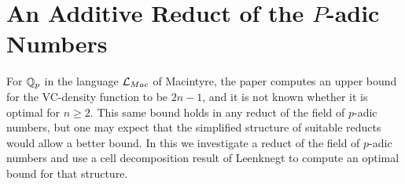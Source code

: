 



\chapter{An Additive Reduct of the $P$-adic Numbers}
For $\mathbb{Q}_p$ in the language $\mathcal L_{Mac}$ of Macintyre, the paper \cite{density} computes an upper bound for the VC-density function to be $2n-1$, and it is not known whether it is optimal for $n \geq 2$.
This same bound holds in any reduct of the field of $p$-adic numbers, but one may expect that the simplified structure of suitable reducts would allow a better bound.
In this \chapa we investigate a reduct of the field of $p$-adic numbers and
use a cell decomposition result of Leenknegt to compute an optimal bound for that structure.

